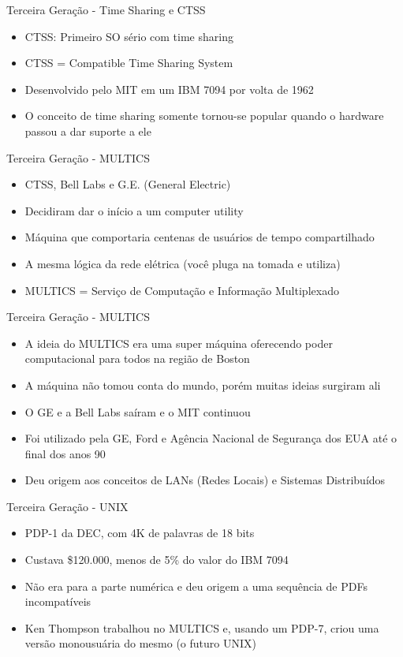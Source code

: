 \documentclass{beamer}
\begin{document}
  \begin{frame}{Terceira Geração - Time Sharing e CTSS}
      \begin{itemize}
          \item CTSS: Primeiro SO sério com time sharing
          \item CTSS = Compatible Time Sharing System
          \item Desenvolvido pelo MIT em um IBM 7094 por volta de 1962
          \item O conceito de time sharing somente tornou-se popular quando o hardware passou a dar suporte a ele
      \end{itemize}
  \end{frame}
  \begin{frame}{Terceira Geração - MULTICS}
      \begin{itemize}
          \item CTSS, Bell Labs e G.E. (General Electric)
          \item Decidiram dar o início a um computer utility
          \item Máquina que comportaria centenas de usuários de tempo compartilhado
          \item A mesma lógica da rede elétrica (você pluga na tomada e utiliza)
          \item MULTICS = Serviço de Computação e Informação Multiplexado
      \end{itemize}
  \end{frame}
  \begin{frame}{Terceira Geração - MULTICS}
      \begin{itemize}
          \item A ideia do MULTICS era uma super máquina oferecendo poder computacional para todos na região de Boston
          \item A máquina não tomou conta do mundo, porém muitas ideias surgiram ali
          \item O GE e a Bell Labs saíram e o MIT continuou
          \item Foi utilizado pela GE, Ford e Agência Nacional de Segurança dos EUA até o final dos anos 90
          \item Deu origem aos conceitos de LANs (Redes Locais) e Sistemas Distribuídos
      \end{itemize}
  \end{frame}
  \begin{frame}{Terceira Geração - UNIX}
      \begin{itemize}
          \item PDP-1 da DEC, com 4K de palavras de 18 bits
          \item Custava \$120.000, menos de 5\% do valor do IBM 7094
          \item Não era para a parte numérica e deu origem a uma sequência de PDFs incompatíveis
          \item Ken Thompson trabalhou no MULTICS e, usando um PDP-7, criou uma versão monousuária do mesmo (o futuro UNIX)
      \end{itemize}
  \end{frame}
\end{document}
